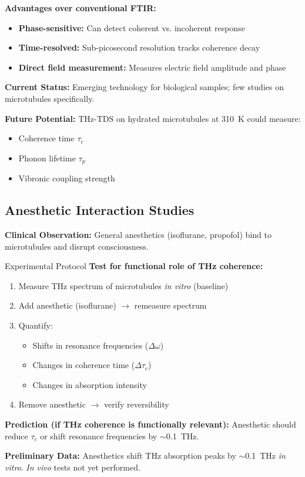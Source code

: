 \textbf{Advantages over conventional FTIR:}
\begin{itemize}
\item \textbf{Phase-sensitive:} Can detect coherent vs. incoherent response
\item \textbf{Time-resolved:} Sub-picosecond resolution tracks coherence decay
\item \textbf{Direct field measurement:} Measures electric field amplitude and phase
\end{itemize}

\textbf{Current Status:} Emerging technology for biological samples; few studies on microtubules specifically.

\textbf{Future Potential:} THz-TDS on hydrated microtubules at 310~K could measure:
\begin{itemize}
\item Coherence time $\tau_c$
\item Phonon lifetime $\tau_p$  
\item Vibronic coupling strength
\end{itemize}

\subsection{Anesthetic Interaction Studies}
\label{subsec:app-anesthetics}

\textbf{Clinical Observation:} General anesthetics (isoflurane, propofol) bind to microtubules and disrupt consciousness.

\begin{calloutbox}{Experimental Protocol}
\textbf{Test for functional role of THz coherence:}

\begin{enumerate}
\item Measure THz spectrum of microtubules \textit{in vitro} (baseline)
\item Add anesthetic (isoflurane) $\rightarrow$ remeasure spectrum
\item Quantify:
  \begin{itemize}
  \item Shifts in resonance frequencies ($\Delta\omega$)
  \item Changes in coherence time ($\Delta\tau_c$)
  \item Changes in absorption intensity
  \end{itemize}
\item Remove anesthetic $\rightarrow$ verify reversibility
\end{enumerate}

\textbf{Prediction (if THz coherence is functionally relevant):} Anesthetic should reduce $\tau_c$ or shift resonance frequencies by $\sim$0.1~THz.

\textbf{Preliminary Data:} Anesthetics shift THz absorption peaks by $\sim$0.1~THz \textit{in vitro}. \textit{In vivo} tests not yet performed.
\end{calloutbox}

